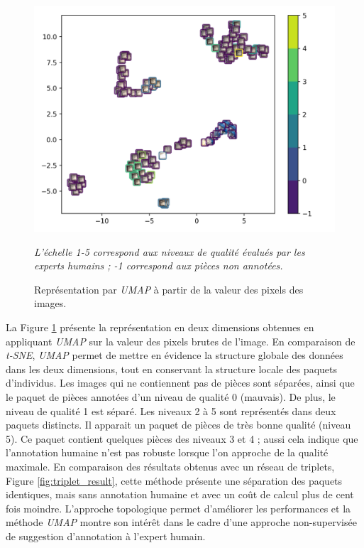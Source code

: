 \begin{figure}[hbtp]
	\centering
	\includegraphics[width=\textwidth,height=\textheight,keepaspectratio]{../Chap4/Figures/visualize_UMAP_pixel_space.png}
	\caption{Représentation par \textit{UMAP} à partir de la valeur des pixels des images.}
	\textit{L'échelle 1-5 correspond aux niveaux de qualité évalués par les experts humains ; -1 correspond aux pièces non annotées.}
	\label{fig:umap}
\end{figure}

La Figure \ref{fig:umap} présente la représentation en deux dimensions obtenues en appliquant \textit{UMAP} sur la valeur des pixels brutes de l'image.
En comparaison de \textit{t-SNE}, \textit{UMAP} permet de mettre en évidence la structure globale des données dans les deux dimensions, tout en conservant la structure locale des paquets d'individus.
Les images qui ne contiennent pas de pièces sont séparées, ainsi que le paquet de pièces annotées d'un niveau de qualité 0 (mauvais).
De plus, le niveau de qualité 1 est séparé.
Les niveaux 2 à 5 sont représentés dans deux paquets distincts.
Il apparait un paquet de pièces de très bonne qualité (niveau 5).
Ce paquet contient quelques pièces des niveaux 3 et 4 ; aussi cela indique que l'annotation humaine n'est pas robuste lorsque l'on approche de la qualité maximale.
En comparaison des résultats obtenus avec un réseau de triplets, Figure \ref{fig:triplet_result}, cette méthode présente une séparation des paquets identiques, mais sans annotation humaine et avec un coût de calcul plus de cent fois moindre.
L'approche topologique permet d'améliorer les performances et la méthode \textit{UMAP} montre son intérêt dans le cadre d'une approche non-supervisée de suggestion d'annotation à l'expert humain.

